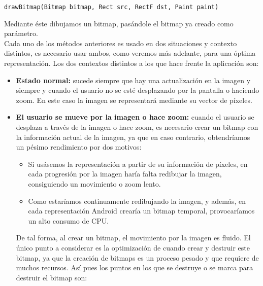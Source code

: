 \begin{lstlisting}
drawBitmap(Bitmap bitmap, Rect src, RectF dst, Paint paint)
\end{lstlisting}

Mediante éste dibujamos un bitmap, pasándole el bitmap ya creado como parámetro.\\

Cada uno de los métodos anteriores es usado en dos situaciones y contexto distintos, es necesario usar ambos, como veremos más adelante, para una óptima representación. Los dos contextos distintos a los que hace frente la aplicación son:\\

\begin{itemize}
\item \textbf{Estado normal:} sucede siempre que hay una actualización en la imagen y siempre y cuando el usuario no se esté desplazando por la pantalla o haciendo zoom. En este caso la imagen se representará mediante su vector de píxeles.

\item \textbf{El usuario se mueve por la imagen o hace zoom:} cuando el usuario se desplaza a través de la imagen o hace zoom, es necesario crear un bitmap con la información actual de la imagen, ya que en caso contrario, obtendríamos un pésimo rendimiento por dos motivos:

\begin{itemize}
\item Si usásemos la representación a partir de su información de píxeles, en cada progresión por la imagen haría falta redibujar la imagen, consiguiendo un movimiento o zoom lento.
\item Como estaríamos continuamente redibujando la imagen, y además, en cada representación Android crearía un bitmap temporal,     provocaríamos un alto consumo de CPU.\\
\end{itemize}

De tal forma, al crear un bitmap, el movimiento por la imagen es fluido. El único punto a considerar es la optimización de cuando crear y destruir este bitmap, ya que la creación de bitmaps es un proceso pesado y que requiere de muchos recursos. Así pues los puntos en los que se destruye o se marca para destruir el bitmap son:


\end{itemize}
